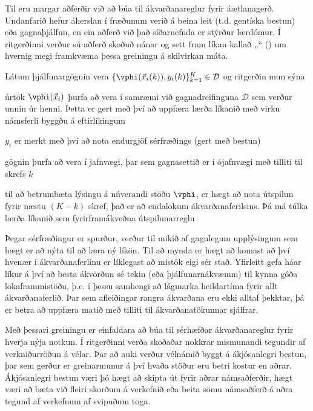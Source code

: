 Til eru margar aðferðir við að búa til ákvarðanareglur fyrir áætlanagerð. 
Undanfarið hefur áherslan í fræðunum verið á beina leit (t.d. gentíska bestun) 
eða gagnaþjálfun, en ein aðferð við það síðarnefnda er stýrður lærdómur.
Í ritgerðinni verður sú aðferð skoðuð nánar og sett fram líkan kallað 
„\fullnameAlice“ (\Alice) um hvernig megi 
framkvæma þessa greiningu á skilvirkan máta. 

Látum þjálfunargögnin vera 
\mbox{$\{\vphi(\vec{x}_i(k)),y_i(k)\}_{k=1}^K\in\mathcal{D}$} og ritgerðin mun 
sýna
\begin{enumerate*}[itemjoin*={{; einnig }}]
    \item úrtök $\vphi(\vec{x}_i)$ þurfa að vera í samræmi við gagnadreifinguna
    $\mathcal{D}$ sem verður unnin úr henni. Þetta er gert með því að uppfæra 
    lærða líkanið með virku námsferli byggðu á eftirlíkingum
    \item $y_i$ er merkt með því að nota endurgjöf sérfræðings (gert með bestun)
    \item gögnin þurfa að vera í jafnvægi, þar sem gagnasettið er í ójafnvægi 
    með tilliti til skrefs $k$
    \item til að betrumbæta lýsingu á núverandi stöðu $\vphi$, er hægt að 
    nota útspilun fyrir næstu 
    $(K-k)$ skref, það er að endalokum ákvarðanaferilsins. Þá má túlka 
    lærða líkanið sem fyrirframákveðna útspilunarreglu
\end{enumerate*}

Þegar sérfræðingur er spurður, verður til mikið af gagnlegum upplýsingum sem 
hægt er að nýta til að læra ný líkön. Til að mynda er hægt að komast að því 
hvenær í ákvarðana\-ferlinu er líklegast að mistök eigi sér stað. Yfirleitt 
gefa háar líkur á því að besta ákvörðun sé tekin (eða þjálfunarnákvæmni) til 
kynna góða lokaframmistöðu, þ.e. í þessu samhengi að lágmarka heildartíma fyrir 
allt ákvarðanaferlið. 
Þar sem afleiðingar rangra ákvarðana eru ekki alltaf þekktar, 
þá er betra að uppfæra matið með tilliti til ákvarðanatökunnar sjálfrar.

Með þessari greiningu er einfaldara að búa til sérhæfðar ákvarðanareglur fyrir 
hverja nýja notkun. Í ritgerðinni verða skoðaðar nokkrar mismunandi tegundir af 
verkniðurröðun á vélar. 
Þar að auki verður vélnámið byggt á ákjósanlegri bestun, þar sem gerður er 
greinar\-munur á því hvaða stöður eru betri kostur en aðrar. Ákjósanlegri 
bestun væri þó hægt að skipta út fyrir aðrar námsaðferðir, hægt væri að bæta 
við fleiri skorðum á verkefnið eða beita sömu námsaðferð á aðra tegund af 
verkefnum af svipuðum toga. 

